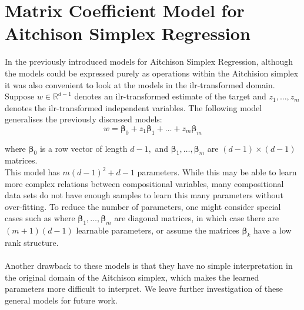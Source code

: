 \documentclass[BSc]{usydthesis}
\numberwithin{equation}{chapter}
\theoremstyle{remark}
\begin{document}
\section{Matrix Coefficient Model for Aitchison Simplex Regression}

In the previously introduced models for Aitchison Simplex Regression, although the models could be expressed purely as operations within the Aitchision simplex it was also convenient to look at the models in the ilr-transformed domain. Suppose $w\in \mathbb{R}^{d-1}$ denotes an ilr-transformed estimate of the target and $z_1, \ldots, z_m$ denotes the ilr-transformed independent variables. The following model generalises the previously discussed models:
$$ w = \bm{\beta}_0 + z_1 \bm{\beta}_1 + \ldots + z_m \bm{\beta}_m$$

where $\bm{\beta}_0$ is a row vector of length $d-1,$ and $\bm{\beta}_1, \ldots, \bm{\beta}_m$ are $(d-1) \times (d-1)$ matrices.  
\\
This model has $m(d-1)^2 + d-1$ parameters. While this may be able to learn more complex relations between compositional variables, many compositional data sets do not have enough samples to learn this many parameters without over-fitting. To reduce the number of parameters, one might consider special cases such as where $\bm{\beta}_1, \ldots, \bm{\beta}_m$ are diagonal matrices, in which case there are $(m+1)(d-1)$ learnable parameters, or assume the matrices $\bm{\beta}_k$ have a low rank structure. \\
\\
Another drawback to these models is that they have no simple interpretation in the original domain of the Aitchison simplex, which makes the learned parameters more difficult to interpret. We leave further investigation of these general models for future work.\\
\end{document}
